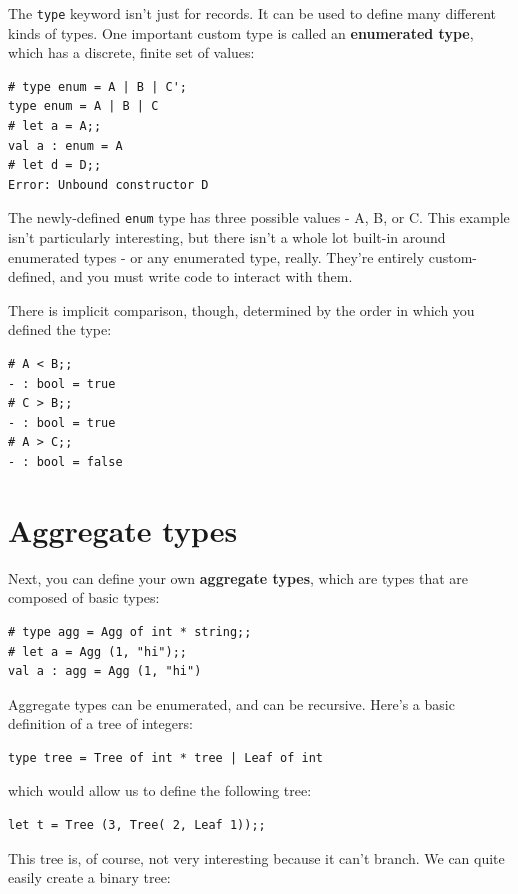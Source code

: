 \documentclass[10pt]{book}
\begin{document}
{The {\tt type} keyword isn't just for records. It can be used to define many different kinds of types. One important custom type is called an {\bf enumerated type}, which has a discrete, finite set of values:

\beforeverb
\begin{verbatim}
# type enum = A | B | C';
type enum = A | B | C
# let a = A;;
val a : enum = A
# let d = D;;
Error: Unbound constructor D
\end{verbatim}
\afterverb

The newly-defined {\tt enum} type has three possible values - A, B, or C. This example isn't particularly interesting, but there isn't a whole lot built-in around enumerated types - or any enumerated type, really. They're entirely custom-defined, and you must write code to interact with them.

There is implicit comparison, though, determined by the order in which you defined the type:

\beforeverb
\begin{verbatim}
# A < B;;
- : bool = true
# C > B;;
- : bool = true
# A > C;;
- : bool = false
\end{verbatim}
\afterverb

\section{Aggregate types}

Next, you can define your own {\bf aggregate types}, which are types that are composed of basic types:

\beforeverb
\begin{verbatim}
# type agg = Agg of int * string;;
# let a = Agg (1, "hi");;
val a : agg = Agg (1, "hi")
\end{verbatim}
\afterverb

Aggregate types can be enumerated, and can be recursive. Here's a basic definition of a tree of integers:

\beforeverb
\begin{verbatim}
type tree = Tree of int * tree | Leaf of int
\end{verbatim}
\afterverb

which would allow us to define the following tree:

\beforeverb
\begin{verbatim}
let t = Tree (3, Tree( 2, Leaf 1));;
\end{verbatim}
\afterverb

This tree is, of course, not very interesting because it can't branch. We can quite easily create a binary tree:

}
\end{document}

